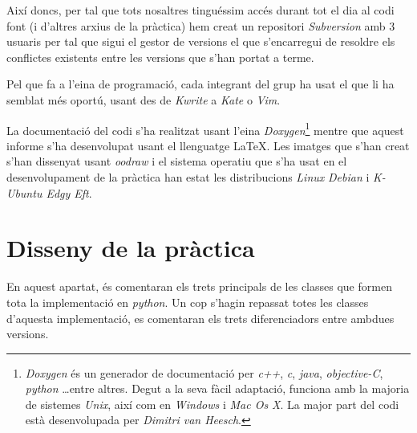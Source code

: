 \documentclass[a4paper,10pt]{article}
\begin{document}
		Així doncs, per tal que tots nosaltres tinguéssim accés durant tot el dia al codi font (i d'altres arxius de la pràctica) hem creat un repositori \emph{Subversion} amb 3 usuaris per tal que sigui el gestor de versions el que s'encarregui de resoldre els conflictes existents entre les versions que s'han portat a terme.

		Pel que fa a l'eina de programació, cada integrant del grup ha usat el que li ha semblat més oportú, usant des de \emph{Kwrite} a \emph{Kate} o \emph{Vim}.

		La documentació del codi s'ha realitzat usant l'eina \emph{Doxygen}\footnote{\emph{Doxygen} és un generador de documentació per \emph{c++}, \emph{c}, \emph{java}, \emph{objective-C}, \emph{python} \ldots entre altres. Degut a la seva fàcil adaptació, funciona amb la majoria de sistemes \emph{Unix}, així com en \emph{Windows} i \emph{Mac Os X}. La major part del codi està desenvolupada per \emph{Dimitri van Heesch}.} mentre que aquest informe s'ha desenvolupat usant el llenguatge \LaTeX. Les imatges que s'han creat s'han dissenyat usant \emph{oodraw} i el sistema operatiu que s'ha usat en el desenvolupament de la pràctica han estat les distribucions \emph{Linux} \emph{Debian} i \emph{K-Ubuntu Edgy Eft}.

\section{Disseny de la pràctica}
En aquest apartat, és comentaran els trets principals de les classes que formen tota la implementació en \emph{python}. Un cop s'hagin repassat totes les classes d'aquesta implementació, es comentaran els trets diferenciadors entre ambdues versions.
\end{document}
